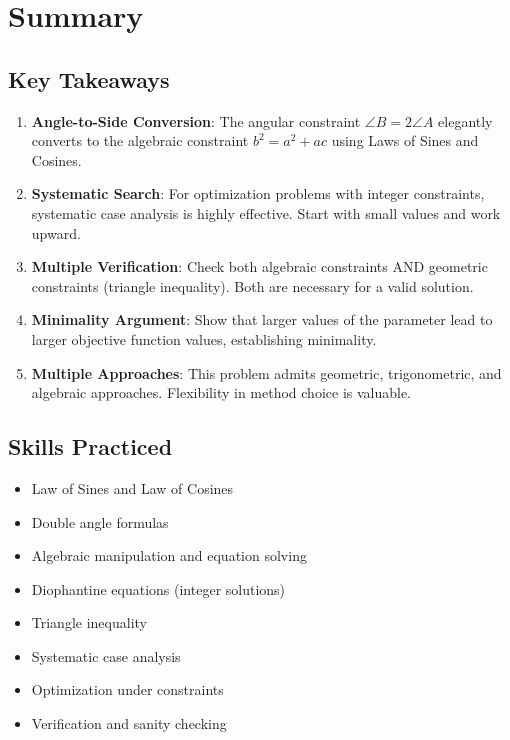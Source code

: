 \documentclass[12pt]{article}
\begin{document}
\section*{Summary}

\subsection*{Key Takeaways}

\begin{enumerate}
    \item \textbf{Angle-to-Side Conversion}: The angular constraint $\angle B = 2\angle A$ elegantly converts to the algebraic constraint $b^2 = a^2 + ac$ using Laws of Sines and Cosines.
    
    \item \textbf{Systematic Search}: For optimization problems with integer constraints, systematic case analysis is highly effective. Start with small values and work upward.
    
    \item \textbf{Multiple Verification}: Check both algebraic constraints AND geometric constraints (triangle inequality). Both are necessary for a valid solution.
    
    \item \textbf{Minimality Argument}: Show that larger values of the parameter lead to larger objective function values, establishing minimality.
    
    \item \textbf{Multiple Approaches}: This problem admits geometric, trigonometric, and algebraic approaches. Flexibility in method choice is valuable.
\end{enumerate}

\subsection*{Skills Practiced}

\begin{itemize}
    \item Law of Sines and Law of Cosines
    \item Double angle formulas
    \item Algebraic manipulation and equation solving
    \item Diophantine equations (integer solutions)
    \item Triangle inequality
    \item Systematic case analysis
    \item Optimization under constraints
    \item Verification and sanity checking
\end{itemize}
\end{document}

